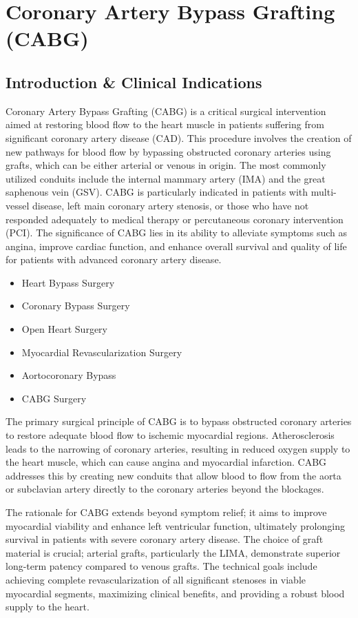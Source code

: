 \chapter{Coronary Artery Bypass Grafting (CABG)}

\section*{Introduction \& Clinical Indications}
Coronary Artery Bypass Grafting (CABG) is a critical surgical intervention aimed at restoring blood flow to the heart muscle in patients suffering from significant coronary artery disease (CAD). This procedure involves the creation of new pathways for blood flow by bypassing obstructed coronary arteries using grafts, which can be either arterial or venous in origin. The most commonly utilized conduits include the internal mammary artery (IMA) and the great saphenous vein (GSV). CABG is particularly indicated in patients with multi-vessel disease, left main coronary artery stenosis, or those who have not responded adequately to medical therapy or percutaneous coronary intervention (PCI). The significance of CABG lies in its ability to alleviate symptoms such as angina, improve cardiac function, and enhance overall survival and quality of life for patients with advanced coronary artery disease.

\begin{itemize}
  \item Heart Bypass Surgery
  \item Coronary Bypass Surgery
  \item Open Heart Surgery
  \item Myocardial Revascularization Surgery
  \item Aortocoronary Bypass
  \item CABG Surgery
\end{itemize}

The primary surgical principle of CABG is to bypass obstructed coronary arteries to restore adequate blood flow to ischemic myocardial regions. Atherosclerosis leads to the narrowing of coronary arteries, resulting in reduced oxygen supply to the heart muscle, which can cause angina and myocardial infarction. CABG addresses this by creating new conduits that allow blood to flow from the aorta or subclavian artery directly to the coronary arteries beyond the blockages.

The rationale for CABG extends beyond symptom relief; it aims to improve myocardial viability and enhance left ventricular function, ultimately prolonging survival in patients with severe coronary artery disease. The choice of graft material is crucial; arterial grafts, particularly the LIMA, demonstrate superior long-term patency compared to venous grafts. The technical goals include achieving complete revascularization of all significant stenoses in viable myocardial segments, maximizing clinical benefits, and providing a robust blood supply to the heart.

